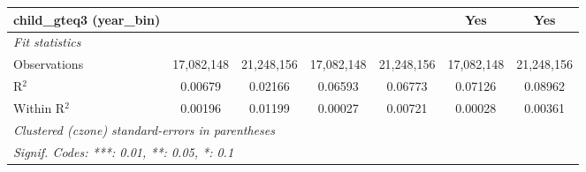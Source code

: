 \begin{tabular}{lcccccc}
child\_gteq3 (year\_bin) &  &  &  &  & Yes & Yes\\
\midrule \emph{Fit statistics}&  & & & & & \\
Observations & 17,082,148&21,248,156&17,082,148&21,248,156&17,082,148&21,248,156\\
R$^2$ & 0.00679&0.02166&0.06593&0.06773&0.07126&0.08962\\
Within R$^2$ & 0.00196&0.01199&0.00027&0.00721&0.00028&0.00361\\
\midrule\midrule\multicolumn{7}{l}{\emph{Clustered (czone) standard-errors in parentheses}}\\
\multicolumn{7}{l}{\emph{Signif. Codes: ***: 0.01, **: 0.05, *: 0.1}}\\
\end{tabular}


